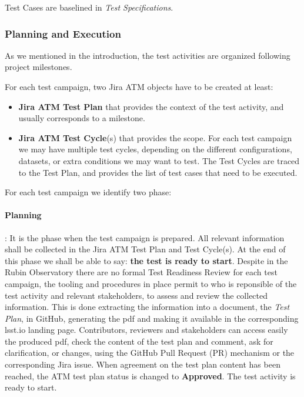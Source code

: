 Test Cases are baselined in \textit{Test Specifications}.

\subsubsection{Planning and Execution}

As we mentioned in the introduction, the test activities are organized following project milestones.

For each test campaign, two Jira ATM objects have to be created at least:

\begin{itemize}
\item \textbf{Jira ATM Test Plan} that provides the context of the test activity, and usually corresponds to a milestone.
\item \textbf{Jira ATM Test Cycle}(s) that provides the scope. For each test campaign we may have multiple test cycles, 
depending on the different configurations, datasets, or extra conditions we may want to test. The Test Cycles are traced
to the Test Plan, and provides the list of test cases that need to be executed.
\end{itemize}

For each test campaign we identify two phase:

\paragraph{Planning}:
It is the phase when the test campaign is prepared. All relevant information shall be collected in the Jira ATM Test Plan and 
Test Cycle(s). 
At the end of this phase we shall be able to say: \textbf{the test is ready to start}.
Despite in the Rubin Observatory there are no formal Test Readiness Review for each test campaign, 
the tooling and procedures in place permit to who is reponsible of the test activity and relevant stakeholders, to assess and review the collected information. 
This is done extracting the information into a document, the \textit{Test Plan}, in GitHub, generating the pdf and making it available
in the corresponding lsst.io landing page. Contributors, reviewers and stakeholders can access easily the produced pdf,
check the content of the test plan and comment, ask for clarification, or changes, using the GitHub
Pull Request (PR) mechanism or the corresponding Jira issue.
When agreement on the test plan content has been reached, the ATM test plan status is changed to \textbf{Approved}. The test activity is ready to start.

